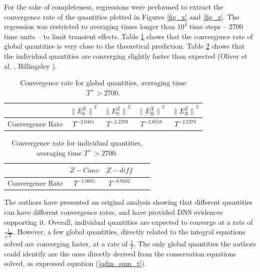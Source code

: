 \documentclass[aip,pof,reprint]{revtex4-1}
\begin{document}
For the sake of completeness, regressions were performed to extract the convergence rate of the quantities plotted in Figures \ref{fig_x} and \ref{fig_z}.
The regression was restricted to averaging times longer than $10^4$ time steps -- $2700$ time units -- to limit transient effects.
Table \ref{tab_conv_rate} shows that the convergence rate of global quantities is very close to the theoretical prediction.
Table \ref{tab_conv_rate_2} shows that the individual quantities are converging slightly faster than expected (Oliver et al. \cite{oliver}, Billingsley \cite{billingsley2008probability}).

\begin{table}
\caption{\label{tab_conv_rate}Convergence rate for global quantities, averaging time $T^+>2700$.}
\begin{ruledtabular}
\begin{tabular}{rcccc}
 & ${\parallel{E_0^X}\parallel}^2$ & ${\parallel{E_0^Z}\parallel}^2$ & ${\parallel{E_R^X}\parallel}^2$ & ${\parallel{E_R^Z}\parallel}^2$ \\
\hline
Convergence Rate & $T^{-2.0481}$ & $T^{-2.2370}$ & $T^{-2.0558}$ & $T^{-2.2370}$ \\
\end{tabular}
\end{ruledtabular}
\end{table}

\begin{table}
\caption{\label{tab_conv_rate_2}Convergence rate for individual quantities, averaging time $T^+>2700$.}
\begin{ruledtabular}
\begin{tabular}{rcccc}
 & $Z-Conv$ & $Z-diff$ \\
\hline
Convergence Rate & $T^{-1.0681}$ & $T^{-0.9332}$ \\
\end{tabular}
\end{ruledtabular}
\end{table}

The authors have presented an original analysis showing that different quantities can have different convergence rates, and have provided DNS evidences supporting it.
Overall, individual quantities are expected to converge at a rate of $\frac{1}{\sqrt{T}}$.
However, a few global quantities, directly related to the integral equations solved are converging faster, at a rate of $\frac{1}{T}$.
The only global quantities the authors could identify are the ones directly derived from the conservation equations solved, as expressed equation (\ref{qdm_sum_t}).
\end{document}
